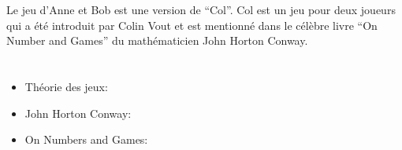 {{Le jeu d’Anne et Bob est une version de “Col”. Col est un jeu pour deux joueurs qui a été introduit par Colin Vout et est mentionné dans le célèbre livre “On Number and Games” du mathématicien John Horton Conway.



\section*{\BrochureWebsitesAndKeywords}
{\raggedright
\begin{itemize}
  \item Théorie des jeux: \href{https://fr.wikipedia.org/wiki/Th\%C3\%A9orie_des_jeux}{}
  \item John Horton Conway: \href{https://fr.wikipedia.org/wiki/John_Horton_Conway}{}
  \item On Numbers and Games: \href{https://fr.wikipedia.org/wiki/On_Numbers_and_Games}{}
\end{itemize}


}

}{}

\def\AuthorRepettoL{} %
\def\AuthorSchluterK{} %
\def\AuthorPluharZ{} %
\def\AuthorDatzkoS{} %
\def\AuthorPelletE{} %

\newpage}{}
